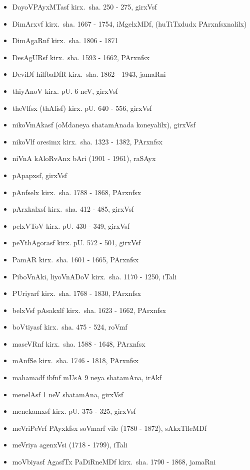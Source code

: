 {\begin{itemize}
\item DayoVPAyxMTasf kirx.~sha. {\rm 250 - 275}, girxVsf
\item DimArxvf kirx.~sha. {\rm 1667 - 1754}, iMgelxMDf, (huTiTxdudx PArxnfsxnalilx)
\item DimAgaRnf kirx.~sha. {\rm 1806 - 1871}
\item DesAgURsf kirx.~sha. {\rm 1593 - 1662}, PArxnfsx
\item DeviDf hilfbaDfR kirx.~sha. {\rm 1862 - 1943}, jamaRni
\item thiyAnoV kirx. pU. {\rm 6} neV, girxVsf
\item theVlfsx (thAlisf) kirx. pU. {\rm 640 - 556}, girxVsf
\item nikoVmAkasf (oMdaneya shatamAnada koneyalilx), girxVsf
\item nikoVlf oresimx kirx.~sha. {\rm 1323 - 1382}, PArxnfsx
\item niVnA kAloRvAnx bAri {\rm (1901 - 1961)}, raSAyx
\item pApapxsf, girxVsf
\item pAnfselx kirx.~sha. {\rm 1788 - 1868}, PArxnfsx
\item pArxkalxsf kirx.~sha. {\rm 412 - 485}, girxVsf
\item pelxVToV kirx. pU. {\rm 430 - 349}, girxVsf
\item peYthAgorasf kirx. pU. {\rm 572 - 501}, girxVsf
\item PamAR kirx.~sha. {\rm 1601 - 1665}, PArxnfsx
\item PiboVnAki, liyoVnADoV kirx.~sha. {\rm 1170 - 1250}, iTali
\item PUriyarf kirx.~sha. {\rm 1768 - 1830}, PArxnfsx
\item belxVsf pAsakxlf kirx.~sha. {\rm 1623 - 1662}, PArxnfsx
\item boVtiyasf kirx.~sha. {\rm 475 - 524}, roVmf
\item maseVRnf kirx.~sha. {\rm 1588 - 1648}, PArxnfsx
\item mAnfSe kirx.~sha. {\rm 1746 - 1818}, PArxnfsx
\item mahamadf ibfnf mUsA {\rm 9} neya shatamAna, irAkf
\item menelAsf {\rm 1} neV shatamAna, girxVsf
\item menekamxsf kirx. pU. {\rm 375 - 325}, girxVsf 
\item meVriPeVrf PAyxkfsx soVmarf vile {\rm (1780 - 1872)}, sAkxTfleMDf
\item meVriya agenxVsi {\rm (1718 - 1799)}, iTali
\item moVbiyasf AgasfTx PaDiRneMDf kirx.~sha. {\rm 1790 - 1868}, jamaRni

\end{itemize}}

